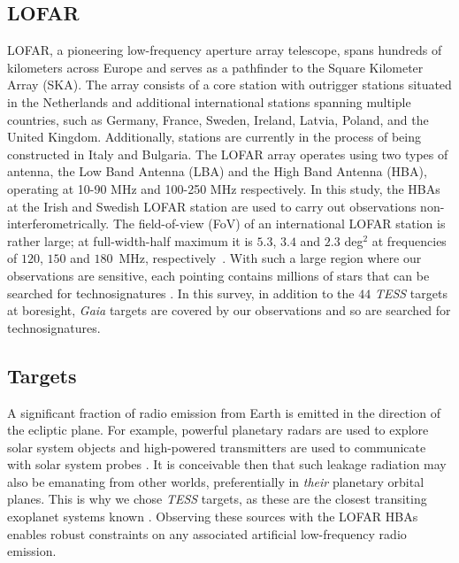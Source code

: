 \subsection{LOFAR}
LOFAR, a pioneering low-frequency aperture array telescope, spans hundreds of kilometers across Europe and serves as a pathfinder to the Square Kilometer Array (SKA). The array consists of a core station with outrigger stations situated in the Netherlands and additional international stations spanning multiple countries, such as Germany, France, Sweden, Ireland, Latvia, Poland, and the United Kingdom. Additionally, stations are currently in the process of being constructed in Italy and Bulgaria. The LOFAR array operates using two types of antenna, the Low Band Antenna (LBA) and the High Band Antenna (HBA), operating at 10-90 MHz and 100-250 MHz respectively. In this study, the HBAs at the Irish and Swedish LOFAR station are used to carry out observations non-interferometrically.  The field-of-view (FoV) of an international LOFAR station is rather large; at full-width-half maximum it is $5.3$, $3.4$ and $2.3$ deg$^2$ at frequencies of $120$, $150$ and $180$~MHz, respectively~\citep{2013arXiv1305.3550V}. With such a large region where our observations are sensitive, each pointing contains millions of stars that can be searched for technosignatures \citep{Bart-Wlodarczyk-Sroka}. In this survey, in addition to the $44$ \textit{TESS} targets at boresight, \gaiatargets \textit{Gaia} targets are covered by our observations and so are searched for technosignatures. 

 \subsection{Targets} \label{sc:targets}

 A significant fraction of radio emission from Earth is emitted in the direction of the ecliptic plane. For example, powerful planetary radars are used to explore solar system objects \citep{Siemion_KEPLER_ApJ} and high-powered transmitters are used to communicate with solar system probes \citep{Enriquez:2017}. It is conceivable then that such leakage radiation may also be emanating from other worlds, preferentially in \textit{their} planetary orbital planes. This is why we chose \textit{TESS} targets, as these are the closest transiting exoplanet systems known \citep{kepler_2008,TESS_2015}. Observing these sources with the LOFAR HBAs enables robust constraints on any associated artificial low-frequency radio emission.  


